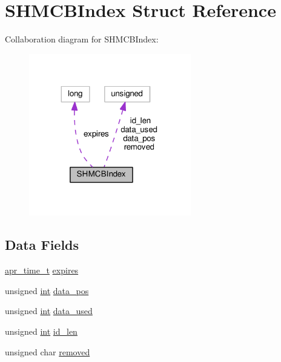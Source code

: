 \hypertarget{structSHMCBIndex}{}\section{S\+H\+M\+C\+B\+Index Struct Reference}
\label{structSHMCBIndex}


Collaboration diagram for S\+H\+M\+C\+B\+Index\+:
\nopagebreak
\begin{figure}[H]
\begin{center}
\leavevmode
\includegraphics[width=200pt]{structSHMCBIndex__coll__graph}
\end{center}
\end{figure}
\subsection*{Data Fields}
\begin{DoxyCompactItemize}
\item 
\hyperlink{group__apr__time_gadb4bde16055748190eae190c55aa02bb}{apr\+\_\+time\+\_\+t} \hyperlink{structSHMCBIndex_a3230fe4b6568ebaf4b018306de3d3ca5}{expires}
\item 
unsigned \hyperlink{pcre_8txt_a42dfa4ff673c82d8efe7144098fbc198}{int} \hyperlink{structSHMCBIndex_ade49ec1fbfcd117fa03e7fb23521695b}{data\+\_\+pos}
\item 
unsigned \hyperlink{pcre_8txt_a42dfa4ff673c82d8efe7144098fbc198}{int} \hyperlink{structSHMCBIndex_ad02f3a3a077cfab6f4577e4f1b8f88e3}{data\+\_\+used}
\item 
unsigned \hyperlink{pcre_8txt_a42dfa4ff673c82d8efe7144098fbc198}{int} \hyperlink{structSHMCBIndex_a6cfcdc446036d404acec4e78f7832c5c}{id\+\_\+len}
\item 
unsigned char \hyperlink{structSHMCBIndex_a6f9ec87ffd84627a9fa1612fa5eb28fb}{removed}
\end{DoxyCompactItemize}


